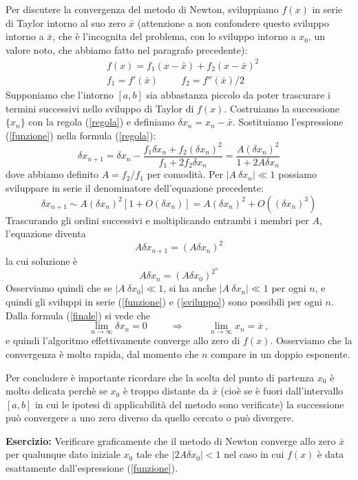 \documentclass[pre,aps,12pt]{revtex4}
\newcommand{\beq}{\begin{equation}}
\newcommand{\eeq}{\end{equation}}
\newcommand{\spazio}{\vspace{.5cm}}
\begin{document}
Per discutere la convergenza del metodo di Newton, sviluppiamo $f(x)$ in
serie di Taylor intorno al suo zero $\bar{x}$ (attenzione a non confondere
questo sviluppo intorno a $\bar{x}$, che \`e l'incognita del problema,
con lo sviluppo intorno a $x_0$, un valore noto, che abbiamo fatto nel
paragrafo precedente):
\beq
\label{funzione}
\begin{split}
&f(x)=f_1 (x-\bar{x})+ f_2 (x-\bar{x})^2 \\
&f_1=f'(\bar{x}) \hspace{1cm} f_2=f''(\bar{x})/2
\end{split}
\eeq
Supponiamo che l'intorno $[a,b]$ sia abbastanza piccolo da poter trascurare
i termini successivi nello sviluppo di Taylor di $f(x)$.
Costruiamo la successione $\{x_n\}$ con la regola (\ref{regola}) e 
definiamo $\delta x_n = x_n - \bar{x}$. 
Sostituiamo l'espressione (\ref{funzione}) nella formula (\ref{regola}):
\beq
\nonumber
\delta x_{n+1} = \delta x_n - \frac{ f_1 \delta x_n + f_2 (\delta x_n )^2 }{f_1 + 2f_2 \delta x_n} =
\frac{A (\delta x_n)^2}{1 + 2A \delta x_n} 
\eeq
dove abbiamo definito $A=f_2/f_1$ per comodit\`a.
Per $|A \ \delta x_n| \ll 1$ possiamo sviluppare in serie il denominatore
dell'equazione precedente:
\beq
\label{sviluppo}
\delta x_{n+1} \sim A (\delta x_n)^2 \left[ 1 + O(\delta x_n) \right] =
A (\delta x_n)^2 + O((\delta x_n)^3)
\eeq
Trascurando gli ordini successivi e moltiplicando entrambi i membri per $A$, l'equazione diventa
\beq
\nonumber
A \delta x_{n+1} = (A \delta x_n)^2
\eeq
la cui soluzione \`e
\beq
\label{finale}
A \delta x_n = (A \delta x_0)^{2^n}
\eeq
Osserviamo quindi che se $|A \ \delta x_0| \ll 1$,  si ha anche $|A \ \delta x_n| \ll 1$ per ogni $n$,
e quindi gli sviluppi in serie (\ref{funzione}) e (\ref{sviluppo}) sono possibili per ogni $n$.
Dalla formula (\ref{finale}) si vede che
\beq
\nonumber
\lim_{n \rightarrow \infty} \delta x_n = 0  \hspace{1cm} \Rightarrow\hspace{1cm}
\lim_{n \rightarrow \infty} x_n = \bar{x} \ ,
\eeq
e quindi l'algoritmo effettivamente converge allo zero di $f(x)$. Osserviamo che la convergenza
\`e molto rapida, dal momento che $n$ compare in un doppio esponente.

\spazio

Per concludere \`e importante ricordare che la scelta del punto di partenza $x_0$ \`e molto delicata
perch\`e se $x_0$ \`e troppo distante da $\bar{x}$ (cio\`e se \`e fuori dall'intervallo $[a,b]$ in
cui le ipotesi di applicabilit\`a del metodo sono verificate) la successione pu\`o convergere a uno 
zero diverso da quello cercato o pu\`o divergere.

\spazio

{\bf Esercizio:} Verificare graficamente che il metodo di Newton converge allo zero $\bar{x}$ per
qualunque dato iniziale $x_0$ tale che $|2 A \delta x_0| < 1$ nel caso in cui $f(x)$ \`e data esattamente
dall'espressione (\ref{funzione}).
\end{document}
